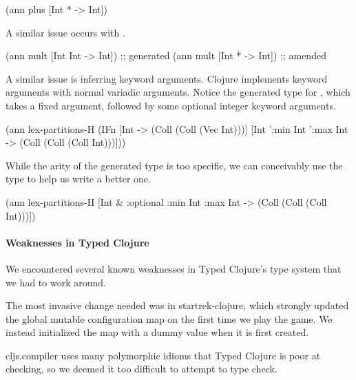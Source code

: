 \begin{cljlisting}
(ann plus [Int * -> Int])
\end{cljlisting}

A similar issue occurs with .

\begin{cljlisting}
(ann mult [Int Int -> Int]) ;; generated
(ann mult [Int * -> Int])   ;; amended
\end{cljlisting}

A similar issue is inferring keyword arguments. Clojure implements
keyword arguments with normal variadic arguments. Notice
the generated type for ,
which takes a fixed argument, followed by some optional integer keyword
arguments. 

\begin{cljlisting}
(ann lex-partitions-H
  (IFn [Int -> (Coll (Coll (Vec Int)))]
       [Int ':min Int ':max Int 
        -> (Coll (Coll (Coll Int)))]))
\end{cljlisting}

While the arity of the generated type is too specific,
we can conceivably use the type to help us write a better one.

\begin{cljlisting}
(ann lex-partitions-H
  [Int & :optional {:min Int :max Int}
   -> (Coll (Coll (Coll Int)))])
\end{cljlisting}

\paragraph{Weaknesses in Typed Clojure}

We encountered several known weaknesses in Typed Clojure's type system
that we had to work around.

The most invasive change needed was in startrek-clojure, which
strongly updated the global mutable configuration map on the first
time we play the game. We instead initialized the map with a dummy
value when it is first created.

cljs.compiler uses many polymorphic idioms that Typed Clojure is
poor at checking, so we deemed it too difficult to attempt to
type check.



